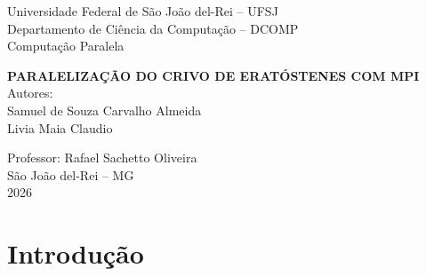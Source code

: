 \documentclass[12pt,a4paper]{article}
\begin{document}

\begin{titlepage}
    \centering

    {\large Universidade Federal de São João del-Rei -- UFSJ}\\
    {\large Departamento de Ciência da Computação -- DCOMP}\\
    {\large Computação Paralela}\\

    \vspace*{5cm}

    {\Large
        \textbf{\MakeUppercase{Paralelização do Crivo de Eratóstenes com MPI}}
    }\\[2cm]

    {\normalsize
        Autores:\\[0.3cm]
        Samuel de Souza Carvalho Almeida\\
        Livia Maia Claudio
    }

    \vfill

    {\normalsize Professor: Rafael Sachetto Oliveira}\\[1cm]
    {\large São João del-Rei -- MG}\\
    {\large 2026}
\end{titlepage}


\tableofcontents
\newpage

\begin{abstract}
Este relatório apresenta a implementação sequencial e a paralelização, com
MPI e no modelo mestre--escravo, do Crivo de Eratóstenes. O intervalo
$[2,N]$ foi dividido em blocos contínuos processados por $P-1$ escravos,
enquanto o processo de rank 0 coordenou a distribuição e a coleta. Foram
realizadas 7350 execuções em dois ambientes do GitHub Actions. No ambiente A,
com dois processadores lógicos, nenhuma configuração MPI superou a versão
sequencial. No ambiente B, com quatro processadores lógicos, 103 das 420
combinações de $N$ e $P$ apresentaram \textit{speedup} maior ou igual a 1. Para
$N=10^9$, o melhor resultado do ambiente B foi $S=1{,}331056$, com 12
processos. A comparação mostra que a quantidade de recursos disponíveis
altera diretamente o benefício obtido com a paralelização.
\end{abstract}

\newpage
{}

\section{Introdução}
\end{document}
